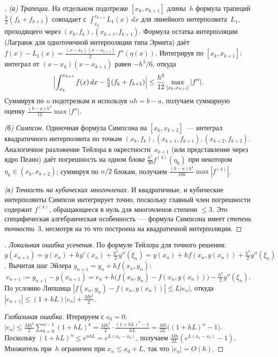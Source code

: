 \begin{proof}[]
\emph{(а) Трапеции.} На отдельном подотрезке $[x_k, x_{k+1}]$ длины~$h$
формула трапеций $\tfrac{h}{2}(f_k + f_{k+1})$ совпадает с
$\int_{x_k}^{x_{k+1}} L_1(x)\, dx$ для линейного интерполянта~$L_1$,
проходящего через $(x_k, f_k), (x_{k+1}, f_{k+1})$. Формула остатка
интерполяции (Лагранж для одноточечной интерполяции типа Эрмита)
даёт $f(x) - L_1(x) = \tfrac{(x - x_k)(x - x_{k+1})}{2}\, f''(\eta(x))$.
Интегрируя по $[x_k, x_{k+1}]$: интеграл от
$(x - x_k)(x - x_{k+1})$ равен $-h^3/6$, откуда
\[
  \Bigl| \int_{x_k}^{x_{k+1}} f(x)\, dx - \tfrac{h}{2}(f_k + f_{k+1}) \Bigr|
  \leq \frac{h^3}{12} \max_{[x_k, x_{k+1}]} |f''|.
\]
Суммируя по $n$ подотрезкам и используя $n h = b - a$, получаем
суммарную оценку $\tfrac{(b - a) h^2}{12} \max |f''|$.

\emph{(б) Симпсон.} Одиночная формула Симпсона на $[x_k, x_{k+2}]$~---
интеграл квадратичного интерполянта по точкам
$(x_k, f_k), (x_{k+1}, f_{k+1}), (x_{k+2}, f_{k+2})$. Аналогичное
разложение Тейлора в окрестности~$x_{k+1}$ (или представление через
ядро Пеано) даёт погрешность на одном блоке
$\tfrac{h^5}{90} f^{(4)}(\eta_k)$ при некотором
$\eta_k \in (x_k, x_{k+2})$; суммируя по $n/2$ блокам, получаем
$\tfrac{(b - a) h^4}{180} \max |f^{(4)}|$.

\emph{(в) Точность на кубических многочленах.} И квадратичные, и
кубические интерполянты Симпсон интегрирует точно, поскольку главный
член погрешности содержит $f^{(4)}$, обращающееся в нуль для
многочленов степени $\leq 3$. Это специфическая алгебраическая
особенность~--- формула Симпсона имеет \emph{степень точности}~$3$,
несмотря на то что построена на квадратичной интерполяции.
\end{proof}

\begin{proof}[]
\emph{Локальная ошибка усечения.} По формуле Тейлора для точного
решения:
$y(x_{n+1}) = y(x_n) + h y'(x_n) + \tfrac{h^2}{2} y''(\xi_n)
            = y(x_n) + h f(x_n, y(x_n)) + \tfrac{h^2}{2} y''(\xi_n)$.
Вычитая шаг Эйлера $y_{n+1} = y_n + h f(x_n, y_n)$:
\[
  e_{n+1} := y_{n+1} - y(x_{n+1}) = e_n + h \bigl(f(x_n, y_n) - f(x_n, y(x_n))\bigr) - \tfrac{h^2}{2} y''(\xi_n).
\]
По условию Липшица
$|f(x_n, y_n) - f(x_n, y(x_n))| \leq L |e_n|$, откуда
$|e_{n+1}| \leq (1 + h L) |e_n| + \tfrac{M h^2}{2}$.

\emph{Глобальная ошибка.} Итерируем с $e_0 = 0$:
$|e_n| \leq \tfrac{M h^2}{2} \sum_{k=0}^{n-1} (1 + h L)^k
        = \tfrac{M h^2}{2} \cdot \tfrac{(1 + h L)^n - 1}{h L}
        = \tfrac{M h}{2 L} \bigl((1 + h L)^n - 1\bigr)$.
Поскольку $(1 + h L)^n \leq e^{n h L} = e^{L (x_n - x_0)}$, получаем
$\tfrac{M h}{2 L} (e^{L (x_n - x_0)} - 1)$. Множитель при~$h$
ограничен при $x_n \leq x_0 + L$, так что $|e_n| = O(h)$.
\end{proof}

